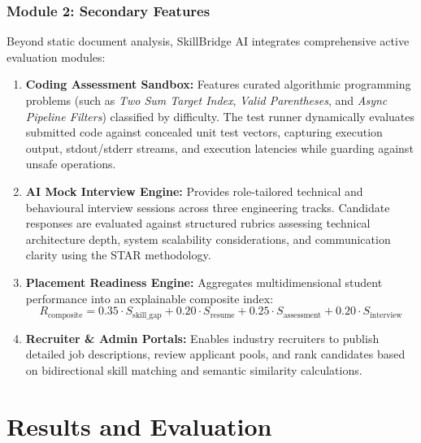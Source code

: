 \documentclass[12pt,a4paper,oneside]{report}
\begin{document}
\subsection{Module 2: Secondary Features}
Beyond static document analysis, SkillBridge AI integrates comprehensive active evaluation modules:
\begin{enumerate}[leftmargin=0.8cm]
    \item \textbf{Coding Assessment Sandbox:} Features curated algorithmic programming problems (such as \textit{Two Sum Target Index}, \textit{Valid Parentheses}, and \textit{Async Pipeline Filters}) classified by difficulty. The test runner dynamically evaluates submitted code against concealed unit test vectors, capturing execution output, stdout/stderr streams, and execution latencies while guarding against unsafe operations.
    \item \textbf{AI Mock Interview Engine:} Provides role-tailored technical and behavioural interview sessions across three engineering tracks. Candidate responses are evaluated against structured rubrics assessing technical architecture depth, system scalability considerations, and communication clarity using the STAR methodology.
    \item \textbf{Placement Readiness Engine:} Aggregates multidimensional student performance into an explainable composite index:
    \begin{equation}
        R_{\text{composite}} = 0.35 \cdot S_{\text{skill\_gap}} + 0.20 \cdot S_{\text{resume}} + 0.25 \cdot S_{\text{assessment}} + 0.20 \cdot S_{\text{interview}}
    \end{equation}
    \item \textbf{Recruiter \& Admin Portals:} Enables industry recruiters to publish detailed job descriptions, review applicant pools, and rank candidates based on bidirectional skill matching and semantic similarity calculations.
\end{enumerate}

\newpage
\thispagestyle{empty}
\hbox{}
\thispagestyle{empty}
\newpage

\setcounter{page}{9}
\chapter{Results and Evaluation}
\end{document}
